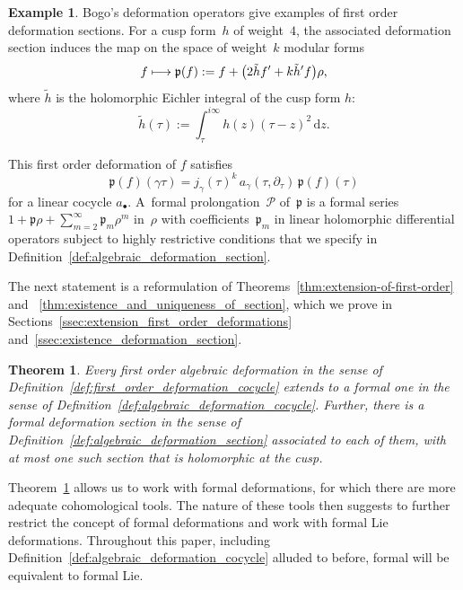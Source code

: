 \documentclass[JEP,XML,SOM,Unicode,published]{cedram}
\newcommand\mto{\mathchoice{\longmapsto}{\mapsto}{\mapsto}{\mapsto}}
\let\oldbullet\bullet
\renewcommand{\bullet}{{\scriptscriptstyle\oldbullet}}
\theoremstyle{plain}
\newtheorem{maintheorem}[maintheoremcounter]{Theorem}
\theoremstyle{definition}
\newtheorem{mainexample}{Example}
\newcommand{\tx}{\text}
\newcommand{\cP}{\ensuremath{\mathcal{P}}}
\newcommand{\frakp}{\ensuremath{\mathfrak{p}}}
\newcommand{\rmd}{\ensuremath{\mathrm{d}}}
\newcommand{\defeq}{:=}
\let\ga\gamma
\newcommand{\dz}{\rmd z}
\begin{document}
\begin{mainexample}
Bogo's deformation operators give examples of first order deformation sections. For a cusp form~$h$ of weight~$4$, the associated deformation section induces the map on the space of weight~$k$ modular forms
\begin{equation*}
f \mto \frakp(f)
\defeq
f + \bigl(2\tilde{h}f^\prime + k \tilde{h}^\prime f\bigr)\rho
\tx{,}
\end{equation*}
where $\tilde{h}$ is the holomorphic Eichler integral of the cusp form $h$:
\begin{equation}
\tilde{h}(\tau)
\defeq
\int_{\tau}^{i\infty} h(z)(\tau-z)^2 \,\dz\tx{.}
\end{equation}

This first order deformation of $f$ satisfies
\begin{equation*}
\frakp(f)(\ga\tau)
=
j_\ga(\tau)^k\, a_\ga(\tau,\partial_\tau)\, \frakp(f)(\tau)
\end{equation*}
for a linear cocycle $a_\bullet$. A~formal prolongation~$\cP$ of~$\frakp$ is a formal series~$1 + \frakp \rho + \sum_{m=2}^\infty \frakp_m \rho^m$ in~$\rho$ with coefficients~$\frakp_m$ in linear holomorphic differential operators subject to highly restrictive conditions that we specify in Definition~\ref{def:algebraic_deformation_section}.
\end{mainexample}

The next statement is a reformulation of Theorems~\ref{thm:extension-of-first-order} and ~\ref{thm:existence_and_uniqueness_of_section}, which we prove in Sections~\ref{ssec:extension_first_order_deformations} and~\ref{ssec:existence_deformation_section}.

\begin{maintheorem}
\label{mainthm:extension_from_first_order}
Every first order algebraic deformation in the sense of Definition~\ref{def:first_order_deformation_cocycle} extends to a formal one in the sense of Definition~\ref{def:algebraic_deformation_cocycle}. Further, there is a formal deformation section in the sense of Definition~\ref{def:algebraic_deformation_section} associated to each of them, with at most one such section that is holomorphic at the cusp.
\end{maintheorem}

Theorem~\ref{mainthm:extension_from_first_order} allows us to work with formal deformations, for which there are more adequate cohomological tools. The nature of these tools then suggests to further restrict the concept of formal deformations and work with formal Lie deformations. Throughout this paper, including Definition~\ref{def:algebraic_deformation_cocycle} alluded to before, formal will be equivalent to formal Lie.
\end{document}
